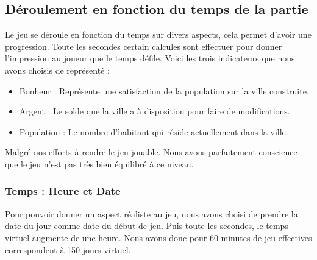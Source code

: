 \documentclass[a4paper,10pt,openany,oneside]{report}
\begin{document}
\subsection{Déroulement en fonction du temps de la partie}
Le jeu se déroule en fonction du temps sur divers aspects, cela permet d'avoir une progression. Toute les secondes certain calcules sont effectuer pour donner l'impression au joueur que le temps défile. Voici les trois indicateurs que nous avons choisis de représenté :
\begin{itemize}
	\item Bonheur : Représente une satisfaction de la population sur la ville construite.
	\item Argent : Le solde que la ville a à disposition pour faire de modifications.
	\item Population : Le nombre d'habitant qui réside actuellement dans la ville.
\end{itemize}
Malgré nos efforts à rendre le jeu jouable. Nous avons parfaitement conscience que le jeu n'est pas très bien équilibré à ce niveau.
\subsubsection{Temps : Heure et Date}
Pour pouvoir donner un aspect réaliste au jeu, nous avons choisi de prendre la date du jour comme date du début de jeu. Puis toute les secondes, le temps virtuel augmente de une heure. Nous avons donc pour 60 minutes de jeu effectives correspondent à 150 jours virtuel.
\end{document}

